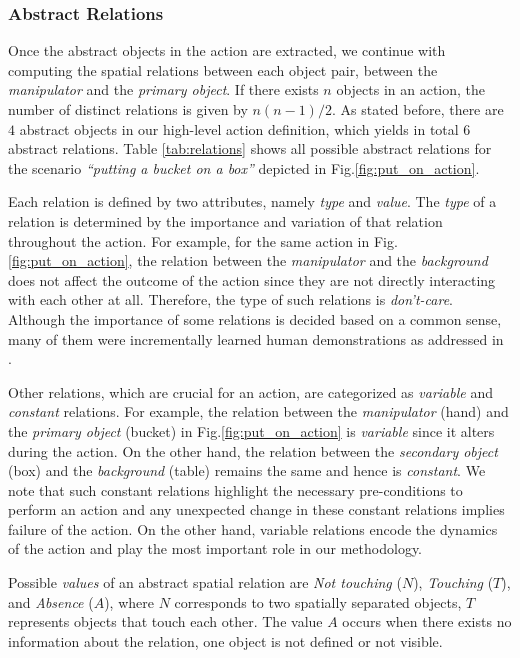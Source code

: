 \subsubsection{Abstract Relations}
\label{sec:abstractrelations}

Once the abstract objects in the action are extracted, we continue with computing the spatial relations between each object pair, \eg between the {\it manipulator} and the {\it primary object}.
If there exists $n$ objects in an action, the number of distinct relations is given by  $n(n-1)/2$.
As stated before, there are $4$ abstract objects in our high-level action definition, which yields in total 6 abstract relations. Table \ref{tab:relations} shows all possible abstract relations for the scenario {\it ``putting a bucket on a box''} depicted in Fig.\ref{fig:put_on_action}.


Each relation is defined by two attributes, namely 	\emph{type} and \emph{value}.
The \emph{type} of a relation is determined by the importance and variation of that relation throughout the action.
For example, for the same action in Fig.\ref{fig:put_on_action}, the relation between the {\it manipulator} and the {\it background} does not affect the outcome of the action since they are not directly interacting with each other at all. Therefore, the type of such relations is \emph{don't-care}. Although the importance of some relations is decided based on a common sense, many of them were incrementally learned human demonstrations as addressed in \citep{AksoyRAS2014}.

Other relations, which are crucial for an action, are categorized as \emph{variable} and \emph{constant} relations.
For example, the relation between the {\it manipulator} (\ie hand) and the {\it primary object} (\ie bucket) in Fig.\ref{fig:put_on_action} is \emph{variable} since it alters during the action. On the other hand,
the relation between the  {\it secondary object} (\ie box) and the  {\it background} (\ie table) remains the same and hence is \emph{constant}.
We note that such constant relations highlight the necessary pre-conditions to perform an action and any unexpected change in these constant relations implies failure of the action.
On the other hand, variable relations encode the dynamics of the action and play the most important role in our methodology.

Possible  \emph{values} of an abstract spatial relation are {\it Not touching} ($N$), {\it Touching} ($T$), and {\it Absence} ($A$), where $N$ corresponds to two spatially separated objects, $T$ represents objects that touch each other.  The  value $A$ occurs when there exists no information about the relation, \eg one object is not defined or not visible.
 


